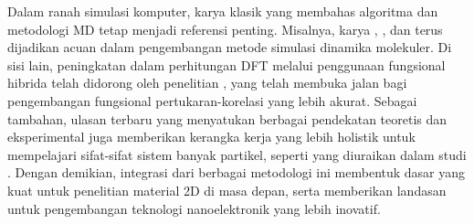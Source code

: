 Dalam ranah simulasi komputer, karya klasik yang membahas algoritma dan metodologi MD tetap menjadi referensi penting.
Misalnya, karya \citep{Allen1989}, \citep{Rapaport2004}, dan \citep{Allen1989} terus dijadikan acuan dalam pengembangan metode simulasi dinamika molekuler.
Di sisi lain, peningkatan dalam perhitungan DFT melalui penggunaan fungsional hibrida telah didorong oleh penelitian \citep{Becke1993}, yang telah membuka jalan bagi pengembangan fungsional pertukaran-korelasi yang lebih akurat.
Sebagai tambahan, ulasan terbaru yang menyatukan berbagai pendekatan teoretis dan eksperimental juga memberikan kerangka kerja yang lebih holistik untuk mempelajari sifat-sifat sistem banyak partikel, seperti yang diuraikan dalam studi \citep{Lele2022}.
Dengan demikian, integrasi dari berbagai metodologi ini membentuk dasar yang kuat untuk penelitian material 2D di masa depan, serta memberikan landasan untuk pengembangan teknologi nanoelektronik yang lebih inovatif.
